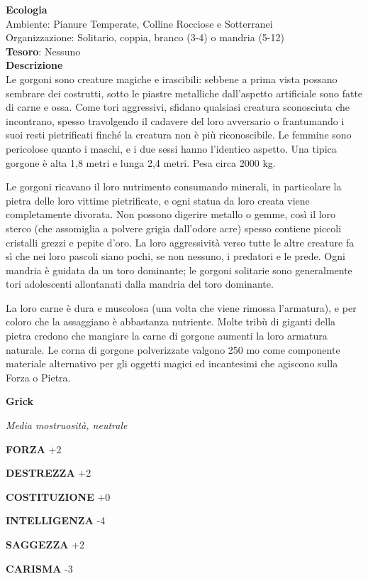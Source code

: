 \begin{multicols}{2}
	\textbf{Ecologia}\\
	Ambiente: Pianure Temperate, Colline Rocciose e Sotterranei\\
	Organizzazione: Solitario, coppia, branco (3-4) o mandria (5-12)\\
	\textbf{Tesoro}: Nessuno\\
	\textbf{Descrizione}\\
	Le gorgoni sono creature magiche e irascibili: sebbene a prima vista possano sembrare dei costrutti, sotto le piastre metalliche dall'aspetto artificiale sono fatte di carne e ossa. Come tori aggressivi, sfidano qualsiasi creatura sconosciuta che incontrano, spesso travolgendo il cadavere del loro avversario o frantumando i suoi resti pietrificati finché la creatura non è più riconoscibile. Le femmine sono pericolose quanto i maschi, e i due sessi hanno l'identico aspetto. Una tipica gorgone è alta 1,8 metri e lunga 2,4 metri. Pesa circa 2000 kg.

	Le gorgoni ricavano il loro nutrimento consumando minerali, in particolare la pietra delle loro vittime pietrificate, e ogni statua da loro creata viene completamente divorata. Non possono digerire metallo o gemme, così il loro sterco (che assomiglia a polvere grigia dall'odore acre) spesso contiene piccoli cristalli grezzi e pepite d'oro. La loro aggressività verso tutte le altre creature fa sì che nei loro pascoli siano pochi, se non nessuno, i predatori e le prede. Ogni mandria è guidata da un toro dominante; le gorgoni solitarie sono generalmente tori adolescenti allontanati dalla mandria del toro dominante.

	La loro carne è dura e muscolosa (una volta che viene rimossa l'armatura), e per coloro che la assaggiano è abbastanza nutriente. Molte tribù di giganti della pietra credono che mangiare la carne di gorgone aumenti la loro armatura naturale. Le corna di gorgone polverizzate valgono 250 mo come componente materiale alternativo per gli oggetti magici ed incantesimi che agiscono sulla Forza o Pietra.


	\medskip{}\textbf{Grick}

	\textit{Media mostruosità, neutrale}

	\textbf{FORZA} +2

	\textbf{DESTREZZA} +2

	\textbf{COSTITUZIONE} +0

	\textbf{INTELLIGENZA} -4

	\textbf{SAGGEZZA} +2

	\textbf{CARISMA} -3


\end{multicols}
